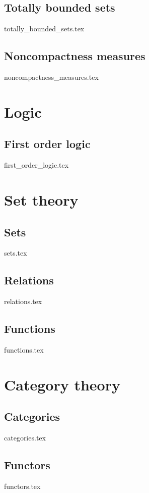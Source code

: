 \documentclass[numbers=endperiod, bibliography=totocnumbered]{scrartcl}
\begin{document}
\subsection{Totally bounded sets}\label{sec:totally_bounded_sets}
{totally_bounded_sets.tex}
\subsection{Noncompactness measures}\label{sec:noncompactness_measures}
{noncompactness_measures.tex}

\section{Logic}\label{sec:logic}
\subsection{First order logic}\label{sec:first_order_logic}
{first_order_logic.tex}

\section{Set theory}\label{sec:set_theory}
\subsection{Sets}\label{sec:sets}
{sets.tex}
\subsection{Relations}\label{sec:relations}
{relations.tex}
\subsection{Functions}\label{sec:functions}
{functions.tex}

\section{Category theory}\label{sec:category_theory}
\subsection{Categories}\label{sec:categories}
{categories.tex}
\subsection{Functors}\label{sec:functors}
{functors.tex}
\end{document}
